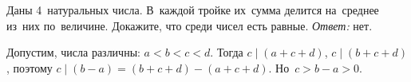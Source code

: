 \problem
Даны 4~натуральных числа.
В~каждой тройке их~сумма делится на~среднее из~них по~величине.
Докажите, что среди чисел есть равные.
\solution
\emph{Ответ:} нет.
\par
Допустим, числа различны: $a < b < c < d$.
Тогда $c \mid (a + c + d)$, $c \mid (b + c + d)$, поэтому
$c \mid (b - a) = (b + c + d) - (a + c + d)$.
Но~$c > b - a > 0$.
\endproblem

